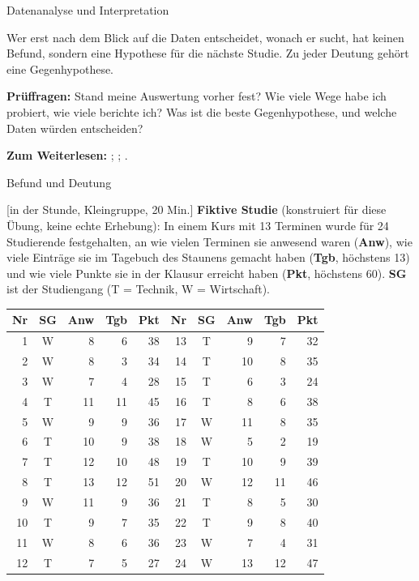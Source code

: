 \begin{handout}{Datenanalyse und Interpretation}
\begin{merkbox}
Wer erst nach dem Blick auf die Daten entscheidet, wonach er sucht, hat
keinen Befund, sondern eine Hypothese für die nächste Studie. Zu jeder
Deutung gehört eine Gegenhypothese.
\end{merkbox}

\textbf{Prüffragen:} Stand meine Auswertung vorher fest? Wie viele Wege
habe ich probiert, wie viele berichte ich? Was ist die beste
Gegenhypothese, und welche Daten würden entscheiden?

\textbf{Zum Weiterlesen:} \textcite{gelmanloken2014forking};
\textcite{nosek2018preregistration}; \textcite{ioannidis2005false}.
\end{handout}

\begin{uebungsblatt}{Befund und Deutung}

[in der Stunde, Kleingruppe, 20 Min.]
\textbf{Fiktive Studie} (konstruiert für diese Übung, keine echte
Erhebung): In einem Kurs mit 13 Terminen wurde für 24 Studierende
festgehalten, an wie vielen Terminen sie anwesend waren (\textbf{Anw}),
wie viele Einträge sie im Tagebuch des Staunens gemacht haben
(\textbf{Tgb}, höchstens 13) und wie viele Punkte sie in der Klausur
erreicht haben (\textbf{Pkt}, höchstens 60). \textbf{SG} ist der
Studiengang (T = Technik, W = Wirtschaft).

\begin{center}
\small
\begin{tabular}{@{}rcrrr@{\hspace{24pt}}rcrrr@{}}
\toprule
\textbf{Nr} & \textbf{SG} & \textbf{Anw} & \textbf{Tgb} & \textbf{Pkt} &
\textbf{Nr} & \textbf{SG} & \textbf{Anw} & \textbf{Tgb} & \textbf{Pkt} \\
\midrule
 1 & W &  8 &  6 & 38 & 13 & T &  9 &  7 & 32 \\
 2 & W &  8 &  3 & 34 & 14 & T & 10 &  8 & 35 \\
 3 & W &  7 &  4 & 28 & 15 & T &  6 &  3 & 24 \\
 4 & T & 11 & 11 & 45 & 16 & T &  8 &  6 & 38 \\
 5 & W &  9 &  9 & 36 & 17 & W & 11 &  8 & 35 \\
 6 & T & 10 &  9 & 38 & 18 & W &  5 &  2 & 19 \\
 7 & T & 12 & 10 & 48 & 19 & T & 10 &  9 & 39 \\
 8 & T & 13 & 12 & 51 & 20 & W & 12 & 11 & 46 \\
 9 & W & 11 &  9 & 36 & 21 & T &  8 &  5 & 30 \\
10 & T &  9 &  7 & 35 & 22 & T &  9 &  8 & 40 \\
11 & W &  8 &  6 & 36 & 23 & W &  7 &  4 & 31 \\
12 & T &  7 &  5 & 27 & 24 & W & 13 & 12 & 47 \\
\bottomrule
\end{tabular}
\end{center}


\end{uebungsblatt}

